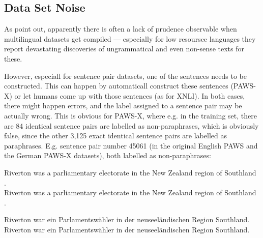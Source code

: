 


\subsection{Data Set Noise}
\label{sec:label-noise}

As \citep{caswell2021quality} point out, apparently there is often a lack of
prudence observable when multilingual datasets get compiled --- especially for
low resoursce languages they report devastating discoveries of ungrammatical
and even non-sense texts for these.


However, especiall for sentence pair datasets, one of the sentences needs to be constructed. This
can happen by automaticall construct these sentences (PAWS-X) or let humans come up with those
sentences (as for XNLI). In both cases, there might happen errors, and the label assigned to a
sentence pair may be actually wrong. This is obvious for PAWS-X, where e.g. in the training set,
there are 84 identical sentence pairs are labelled as non-paraphrases, which is obviously false,
since the other 3,125 exact identical sentence pairs are labelled as paraphrases. E.g. sentence pair
number 45061 (in the original English PAWS and the German PAWS-X datasets), both labelled as
non-paraphrases:

\begin{examples}
  \item Riverton was a parliamentary electorate in the New Zealand region of Southland .\\
        Riverton was a parliamentary electorate in the New Zealand region of Southland .

  \item Riverton war ein Parlamentswähler in der neuseeländischen Region Southland.\\
        Riverton war ein Parlamentswähler in der neuseeländischen Region Southland.
\end{examples}


